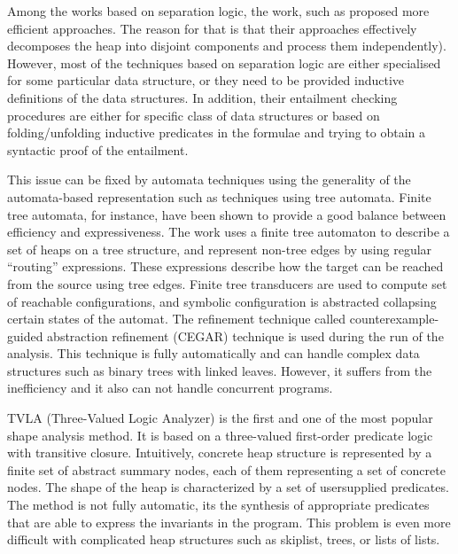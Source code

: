 Among the works based on separation logic, the work, such as \cite{JoshCris:SL,Hongseok:SL, Quang:SL} proposed more efficient approaches. The reason for that is that their approaches effectively decomposes the heap into disjoint components and process them independently). However, most of the techniques based on separation logic are either specialised for some particular data structure, or they need to be provided inductive definitions of the data structures. In addition, their entailment checking procedures are either for specific class of data structures or based on folding/unfolding inductive predicates in the formulae and trying to obtain a syntactic proof of the entailment. 

This issue can be fixed by automata techniques using the generality of the automata-based representation such as techniques using tree automata. Finite tree automata, for instance, have been shown to provide a good balance between efficiency and expressiveness. The work \cite{Ahmed:TreeAutomata} uses a finite tree automaton to describe a set of heaps on a tree structure,
and represent non-tree edges by using regular “routing” expressions. These expressions
describe how the target can be reached from the source using tree edges. Finite tree transducers
are used to compute set of reachable configurations, and symbolic configuration is abstracted
collapsing certain states of the automat. The refinement technique called counterexample-guided
abstraction refinement (CEGAR) technique is used during the run of the analysis. This technique
is fully automatically and can handle complex data structures such as binary trees with linked
leaves. However, it suffers from the inefficiency and it also can not handle concurrent programs.

TVLA (Three-Valued Logic Analyzer) \cite{SagivRW02} is the first and one of the most popular shape analysis
method. It is based on a three-valued first-order predicate logic with transitive closure. Intuitively,
concrete heap structure is represented by a finite set of abstract summary nodes, each of them
representing a set of concrete nodes. The shape of the heap is characterized by a set of usersupplied
predicates. The method is not fully automatic, its the synthesis of appropriate predicates
that are able to express the invariants in the program. This problem is even more difficult with
complicated heap structures such as skiplist, trees, or lists of lists.  
  
